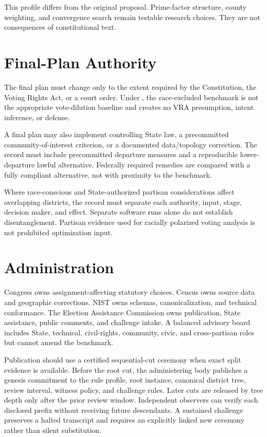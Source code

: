 This profile differs from the original \ar{} proposal. Prime-factor structure,
county weighting, and convergence search remain testable research choices.
They are not consequences of constitutional text.

\section{Final-Plan Authority}

The final plan must change only to the extent required by the Constitution, the
Voting Rights Act, or a court order. Under \allenmilligan{}, the race-excluded
benchmark is not the appropriate vote-dilution baseline and creates no VRA
presumption, intent inference, or defense.

A final plan may also implement controlling State law, a precommitted
community-of-interest criterion, or a documented data/topology correction. The
record must include precommitted departure measures and a reproducible lower-
departure lawful alternative. Federally required remedies are compared with a
fully compliant alternative, not with proximity to the benchmark.

Where race-conscious and State-authorized partisan considerations affect
overlapping districts, the record must separate each authority, input, stage,
decision maker, and effect. Separate software runs alone do not establish
disentanglement. Partisan evidence used for racially polarized voting analysis
is not prohibited optimization input.

\section{Administration}

Congress owns assignment-affecting statutory choices. Census owns source data
and geographic corrections. NIST owns schemas, canonicalization, and technical
conformance. The Election Assistance Commission owns publication, State
assistance, public comments, and challenge intake. A balanced advisory board
includes State, technical, civil-rights, community, civic, and cross-partisan
roles but cannot amend the benchmark.

Publication should use a certified sequential-cut ceremony when exact split
evidence is available. Before the root cut, the administering body publishes a
genesis commitment to the rule profile, root instance, canonical district tree,
review interval, witness policy, and challenge rules. Later cuts are released
by tree depth only after the prior review window. Independent observers can
verify each disclosed prefix without receiving future descendants. A sustained
challenge preserves a halted transcript and requires an explicitly linked new
ceremony rather than silent substitution.

